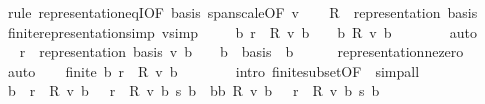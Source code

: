 \begin{isabellebody}
%
\isadelimproof
%
\endisadelimproof
%
\isatagproof
{}\isamarkupfalse%
\ {\isacharparenleft}{\kern0pt}rule\ representation{\isacharunderscore}{\kern0pt}eqI{\isacharbrackleft}{\kern0pt}OF\ basis\ span{\isacharunderscore}{\kern0pt}scale{\isacharbrackleft}{\kern0pt}OF\ v{\isacharbrackright}{\kern0pt}{\isacharbrackright}{\kern0pt}{\isacharparenright}{\kern0pt}\isanewline
\ \ \isamarkupfalse%
\ {\isacharquery}{\kern0pt}R\ {\isacharequal}{\kern0pt}\ {\isachardoublequoteopen}representation\ basis{\isachardoublequoteclose}\isanewline
\ \ \isamarkupfalse%
\ finite{\isacharunderscore}{\kern0pt}representation{\isacharbrackleft}{\kern0pt}simp{\isacharbrackright}{\kern0pt}\ v{\isacharbrackleft}{\kern0pt}simp{\isacharbrackright}{\kern0pt}\isanewline
\ \ \isamarkupfalse%
\ {\isacharasterisk}{\kern0pt}{\isacharcolon}{\kern0pt}\ {\isachardoublequoteopen}{\isacharbraceleft}{\kern0pt}b{\isachardot}{\kern0pt}\ r\ {\isacharasterisk}{\kern0pt}\ {\isacharquery}{\kern0pt}R\ v\ b\ {\isasymnoteq}\ {}{\isacharbraceright}{\kern0pt}\ {\isasymsubseteq}\ {\isacharbraceleft}{\kern0pt}b{\isachardot}{\kern0pt}\ {\isacharquery}{\kern0pt}R\ v\ b\ {\isasymnoteq}\ {}{\isacharbraceright}{\kern0pt}{\isachardoublequoteclose}\isanewline
\ \ \ \ \isamarkupfalse%
\ auto\isanewline
\ \ \isamarkupfalse%
\ \isamarkupfalse%
\ {\isachardoublequoteopen}r\ {\isacharasterisk}{\kern0pt}\ representation\ basis\ v\ b\ {\isasymnoteq}\ {}\ {\isasymLongrightarrow}\ b\ {\isasymin}\ basis{\isachardoublequoteclose}\ \ b\isanewline
\ \ \ \ \isamarkupfalse%
\ representation{\isacharunderscore}{\kern0pt}ne{\isacharunderscore}{\kern0pt}zero\ \isamarkupfalse%
\ auto\isanewline
\ \ \isamarkupfalse%
\ {\isachardoublequoteopen}finite\ {\isacharbraceleft}{\kern0pt}b{\isachardot}{\kern0pt}\ r\ {\isacharasterisk}{\kern0pt}\ {\isacharquery}{\kern0pt}R\ v\ b\ {\isasymnoteq}\ {}{\isacharbraceright}{\kern0pt}{\isachardoublequoteclose}\isanewline
\ \ \ \ \isamarkupfalse%
\ {\isacharparenleft}{\kern0pt}intro\ finite{\isacharunderscore}{\kern0pt}subset{\isacharbrackleft}{\kern0pt}OF\ {\isacharasterisk}{\kern0pt}{\isacharbrackright}{\kern0pt}{\isacharparenright}{\kern0pt}\ simp{\isacharunderscore}{\kern0pt}all\isanewline
\ \ \isamarkupfalse%
\ {\isachardoublequoteopen}{\isacharparenleft}{\kern0pt}{\isasymSum}b\ {\isacharbar}{\kern0pt}\ r\ {\isacharasterisk}{\kern0pt}\ {\isacharquery}{\kern0pt}R\ v\ b\ {\isasymnoteq}\ {}{\isachardot}{\kern0pt}\ {\isacharparenleft}{\kern0pt}r\ {\isacharasterisk}{\kern0pt}\ {\isacharquery}{\kern0pt}R\ v\ b{\isacharparenright}{\kern0pt}\ {\isacharasterisk}{\kern0pt}s\ b{\isacharparenright}{\kern0pt}\ {\isacharequal}{\kern0pt}\ {\isacharparenleft}{\kern0pt}{\isasymSum}b{\isasymin}{\isacharbraceleft}{\kern0pt}b{\isachardot}{\kern0pt}\ {\isacharquery}{\kern0pt}R\ v\ b\ {\isasymnoteq}\ {}{\isacharbraceright}{\kern0pt}{\isachardot}{\kern0pt}\ {\isacharparenleft}{\kern0pt}r\ {\isacharasterisk}{\kern0pt}\ {\isacharquery}{\kern0pt}R\ v\ b{\isacharparenright}{\kern0pt}\ {\isacharasterisk}{\kern0pt}s\ b{\isacharparenright}{\kern0pt}{\isachardoublequoteclose}\isanewline

\end{isabellebody}
